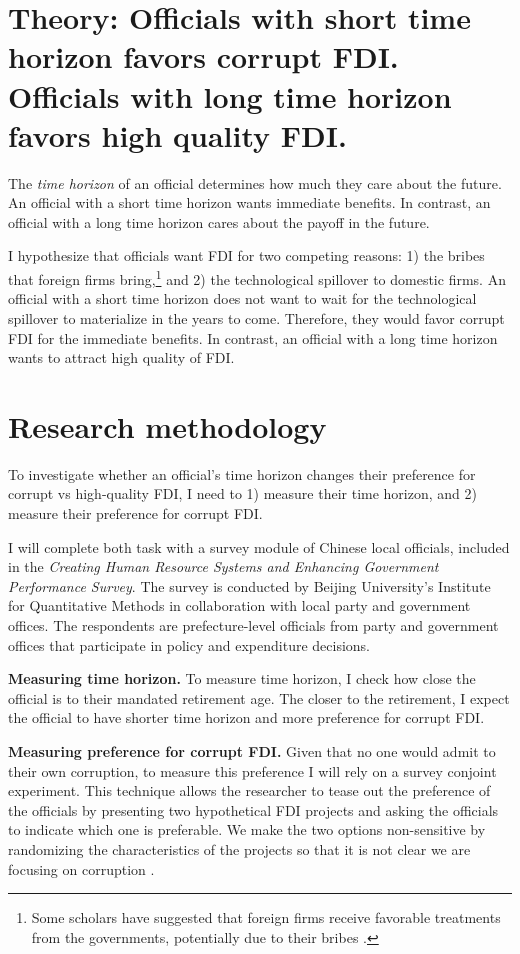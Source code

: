 \documentclass[12pt]{article}
\begin{document}
\section{Theory: Officials with short time horizon favors corrupt FDI. Officials with long time horizon favors high quality FDI.}

The \textit{time horizon} of an official determines how much they care about the future. An official with a short time horizon wants immediate benefits. In contrast, an official with a long time horizon cares about the payoff in the future.

I hypothesize that officials want FDI for two competing reasons: 1) the bribes that foreign firms bring,\footnote{Some scholars have suggested that foreign firms receive favorable treatments from the governments, potentially due to their bribes \citep{Huang2011}.} and 2) the technological spillover to domestic firms. An official with a short time horizon does not want to wait for the technological spillover to materialize in the years to come. Therefore, they would favor corrupt FDI for the immediate benefits. In contrast, an official with a long time horizon wants to attract high quality of FDI.

\section{Research methodology}

To investigate whether an official's time horizon changes their preference for corrupt vs high-quality FDI, I need to 1) measure their time horizon, and 2) measure their preference for corrupt FDI.

I will complete both task with a survey module of Chinese local officials, included in the \textit{Creating Human Resource Systems and Enhancing Government Performance Survey}. The survey is conducted by Beijing University's Institute for Quantitative Methods in collaboration with local party and government offices. The respondents are prefecture-level officials from party and government offices that participate in policy and expenditure decisions.

\textbf{Measuring time horizon.} To measure time horizon, I check how close the official is to their mandated retirement age. The closer to the retirement, I expect the official to have shorter time horizon and more preference for corrupt FDI.

\textbf{Measuring preference for corrupt FDI.} Given that no one would admit to their own corruption, to measure this preference I will rely on a survey conjoint experiment. This technique allows the researcher to tease out the preference of the officials by presenting two hypothetical FDI projects and asking the officials to indicate which one is preferable. We make the two options non-sensitive by randomizing the characteristics of the projects so that it is not clear we are focusing on corruption \citep{Hainmueller2014}.
\end{document}
